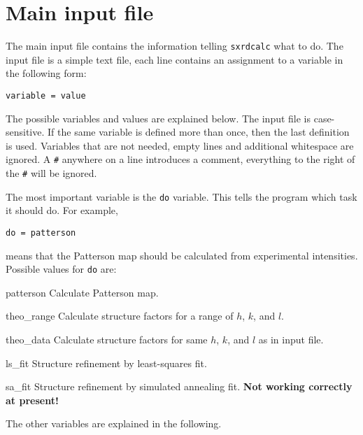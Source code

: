 \documentclass[a4paper]{article}
\begin{document}
\section{Main input file}
The main input file contains the information telling \texttt{sxrdcalc}
what to do. The input file is a simple text file, each line contains
an assignment to a variable in the following form:
\begin{verbatim}
variable = value
\end{verbatim}
The possible variables and values are explained below. The
input file is case-sensitive. If the same variable is defined more
than once, then the last definition is used. Variables that are not needed,
empty lines and additional whitespace are ignored. A \texttt{\#}
anywhere on a line introduces a comment, everything to the right of
the \texttt{\#} will be ignored.

The most important variable is the \texttt{do} variable. This tells
the program which task it should do. For example, 
\begin{verbatim}
do = patterson
\end{verbatim}
means that the Patterson map should be calculated from experimental
intensities. Possible values for \texttt{do} are:
\begin{vardef}
\item[patterson] Calculate Patterson map. 
\item[theo\_range] Calculate structure factors for a range of $h$,
$k$, and $l$. 
\item[theo\_data] Calculate structure factors for same $h$, $k$, and
$l$ as in input file.
\item[ls\_fit] Structure refinement by least-squares fit. 
\item[sa\_fit] Structure refinement by simulated annealing fit.
{\bf Not working correctly at present!}
\end{vardef}

The other variables are explained in the following.
\end{document}
